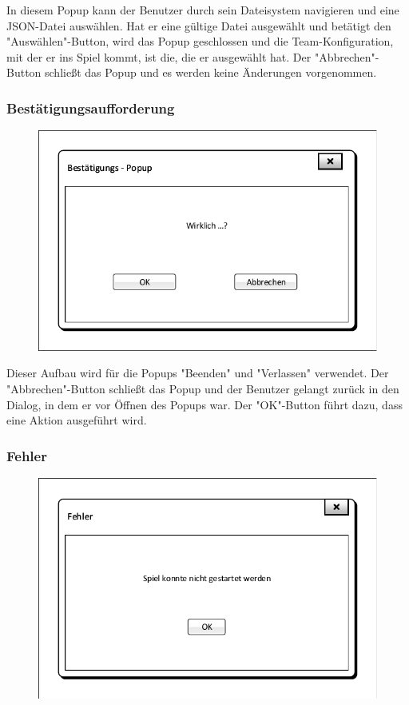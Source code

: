 In diesem Popup kann der Benutzer durch sein Dateisystem navigieren und eine JSON-Datei auswählen. Hat er eine gültige Datei ausgewählt und betätigt den "Auswählen"-Button, wird das Popup geschlossen und die Team-Konfiguration, mit der er ins Spiel kommt, ist die, die er ausgewählt hat. Der "Abbrechen"-Button schließt das Popup und es werden keine Änderungen vorgenommen.

\subsubsection{Bestätigungsaufforderung}
\begin{figure}[H]
	\centering
	\includegraphics[scale=0.8]{images/OK_Popup.pdf}
\end{figure}

Dieser Aufbau wird für die Popups "Beenden" und "Verlassen" verwendet. Der "Abbrechen"-Button schließt das Popup und der Benutzer gelangt zurück in den Dialog, in dem er vor Öffnen des Popups war. Der "OK"-Button führt dazu, dass eine Aktion ausgeführt wird.

\subsubsection{Fehler}
\begin{figure}[H]
	\centering
	\includegraphics[scale=0.8]{images/Fehler_Popup.pdf}
\end{figure}

